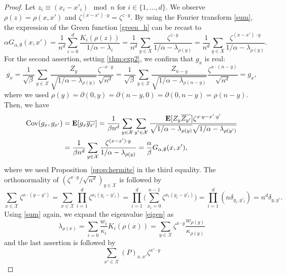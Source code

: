 \documentclass[a4paper,11pt]{article}
\theoremstyle{plain}
\theoremstyle{definition}
\begin{document}
\begin{proof}
  Let $z_i\equiv(x_i-x'_i)\mod n$ for
  $i\in\{1,\ldots,d\}$. We observe
  $\rho(z)=\rho(x,x')$ and 
  $\zeta^{(x-x')\cdot y}=\zeta^{z\cdot y}$.
  By using the Fourier transform \eqref{sum},
  the expression of the Green function \eqref{green_h}
  can be recast to
  \[
    \alpha G_{\alpha,\emptyset}(x,x')
    =\frac{1}{n^d}\sum_{i=0}^d\frac{K_i(\rho(z))}
    {1/\alpha-\lambda_i}
    =\frac{1}{n^d}\sum_{y\in X}
    \frac{\zeta^{z\cdot y}}{1/\alpha-\lambda_{\rho(y)}}
    =\frac{1}{n^d}\sum_{y\in X}
    \frac{\zeta^{(x-x')\cdot y}}{1/\alpha-\lambda_{\rho(y)}}.
  \]
  For the second assertion, setting \eqref{thm:exp2},
  we confirm that $g_x$ is real:
  \[
    \overline{g_x}=\frac{1}{\sqrt{\beta}}\sum_{y\in\mathcal{X}}
    \frac{\overline{Z_y}}{\sqrt{1/\alpha-\lambda_{\rho(y)}}}
    \frac{\zeta^{-x\cdot y}}{\sqrt{n^d}}=
        \frac{1}{\sqrt{\beta}}\sum_{y\in\mathcal{X}}
    \frac{Z_{n-y}}{\sqrt{1/\alpha-\lambda_{\rho(n-y)}}}
    \frac{\zeta^{x\cdot (n-y)}}{\sqrt{n^d}}=g_x,
  \]
  where we used $\rho(y)=\partial(0,y)=\partial(n-y,0)=\partial(0,n-y)=\rho(n-y)$.
  Then, we have
  \begin{align*}
  {\rm Cov}(g_x,g_{x'})&=\mathbf{E}[g_x\overline{g_{x'}}]
  =\frac{1}{\beta n^d}\sum_{y\in\mathcal{X}}\sum_{y'\in\mathcal{X}}
  \frac{\mathbf{E}[Z_y\overline{Z_{y'}}]\zeta^{x\cdot y-x'\cdot y'}}
       {\sqrt{1/\alpha-\lambda_{\rho(y)}}
         \sqrt{1/\alpha-\lambda_{\rho(y')}}}\\
       &=
  \frac{1}{\beta n^d}\sum_{y\in\mathcal{X}}
  \frac{\zeta^{(x-x')\cdot y}}
       {1/\alpha-\lambda_{\rho(y)}}=\frac{\alpha}{\beta} G_{\alpha,\emptyset}(x,x'),      
  \end{align*}
  where we used Proposition~\ref{prop:hermite} in the
  third equality.
  The orthonormality of
  $(\zeta^{x\cdot y}/\sqrt{n^d})_{y\in \mathcal{X}}$
  is followed by
  \[
  \sum_{x\in \mathcal{X}} \zeta^{x\cdot (y-y')}
  =\sum_{x\in \mathcal{X}} \prod_{i=1}^d \zeta^{x_i (y_i-y'_i)}
  =\prod_{i=1}^d
  \Big(\sum_{x_i=0}^{n-1}\zeta^{x_i (y_i-y'_i)}\Big)
  =\prod_{i=1}^d (n\delta_{y_i,y'_i})=n^d\delta_{y,y'}.
  \]
  Using \eqref{sum} again, we expand the eigenvalue
  \eqref{eigen} as
  \begin{equation}\label{thm:exp3}
    \lambda_{\rho(x)}=\sum_{i=0}\frac{w_i}{\kappa_i}
    K_i(\rho(x))=  
    \sum_{y\in \mathcal{X}}\zeta^{x\cdot y}
    \frac{w_{\rho(y)}}{\kappa_{\rho(y)}}
  \end{equation}
  and the last assertion is followed by
  \[
    \sum_{x'\in \mathcal{X}}(P)_{x,x'}\zeta^{x'\cdot y}
\]
\end{proof}
\end{document}
